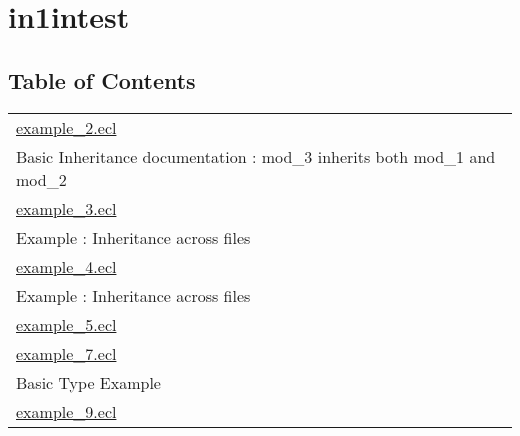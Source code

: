 \chapter*{in1intest}
\hypertarget{ecldoc:toc:intest/in1intest}{}


\section*{Table of Contents}
{\renewcommand{\arraystretch}{1.5}
\begin{longtable}{|p{\textwidth}|}
\hline
\hyperlink{ecldoc:toc:intest.in1intest.example_2}{example\_2.ecl} \\
Basic Inheritance documentation : mod\_3 inherits both mod\_1 and mod\_2 \\
\hline
\hyperlink{ecldoc:toc:intest.in1intest.example_3}{example\_3.ecl} \\
Example : Inheritance across files \\
\hline
\hyperlink{ecldoc:toc:intest.in1intest.example_4}{example\_4.ecl} \\
Example : Inheritance across files \\
\hline
\hyperlink{ecldoc:toc:intest.in1intest.example_5}{example\_5.ecl} \\
\hline
\hyperlink{ecldoc:toc:intest.in1intest.example_7}{example\_7.ecl} \\
Basic Type Example \\
\hline
\hyperlink{ecldoc:toc:intest.in1intest.example_9}{example\_9.ecl} \\
\hline
\end{longtable}
}







